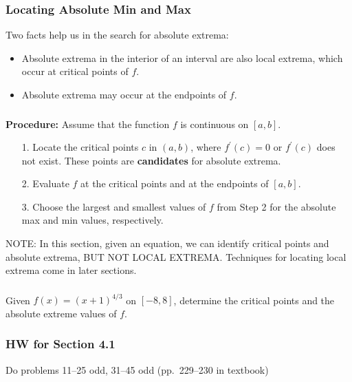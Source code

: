 \documentclass[14pt]{beamer}
\begin{document}
\begin{frame}
\frametitle{Locating Absolute Min and Max}
Two facts help us in the search for absolute extrema:

\begin{itemize}
\item Absolute extrema in the interior of an interval are also local extrema, which occur at critical points of $f$.
\item Absolute extrema may occur at the endpoints of $f$.
\end{itemize}
\end{frame}

\begin{frame}
\frametitle{}
\footnotesize
{\bf Procedure: } Assume that the function $f$ is continuous on $[a,b]$.

\begin{itemize}
\item[1.] Locate the critical points $c$ in $(a,b)$, where $f^{\prime}(c)=0$ or $f^{\prime}(c)$ does not exist.  These points are {\bf candidates} for absolute extrema.
\item[2.] Evaluate $f$ at the critical points and at the endpoints of $[a,b]$.
\item[3.] Choose the largest and smallest values of $f$ from Step 2 for the absolute max and min values, respectively.
\end{itemize}

NOTE:  In this section, given an equation, we can identify critical points and absolute extrema, \alert{BUT NOT LOCAL EXTREMA}.  Techniques for locating local extrema come in later sections.
\end{frame}

\begin{frame}%
\frametitle{}
\begin{exe} Given $f(x)=(x+1)^{4/3}$ on $[-8,8]$, determine the critical points and the absolute extreme values of $f$. \end{exe}
\end{frame}

\begin{frame}
\frametitle{HW for Section 4.1}
Do problems 11--25 odd, 31--45 odd (pp.\ 229--230 in textbook)
\end{frame}

\begin{comment}
\end{comment}
\end{document}
